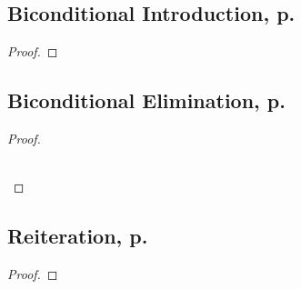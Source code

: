 \begin{multicols}{2}
\subsection{Biconditional Introduction, p.\ \pageref{biint}}
\begin{proof}
	\open
	\close
	\open
	\close
\end{proof}

\subsection{Biconditional Elimination, p.\ \pageref{bielim}}
\begin{proof}
\\	
	 

\\	
	 
\end{proof}

\subsection{Reiteration, p.\ \pageref{reit}}

\begin{proof}
	\have[\ ]{}{\vdots}
	 
\end{proof}


\end{multicols}


